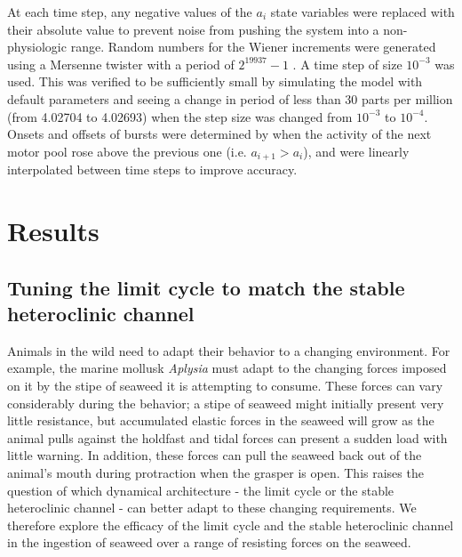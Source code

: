 At each time step, any negative values of the $a_i$ state variables were
replaced with their absolute value to prevent noise from pushing the system
into a non-physiologic range.  Random numbers for the Wiener increments were
generated using a Mersenne twister with a period of $2^{19937} - 1$
\citep{matsumoto_mersenne_1998}.  A time step of size $10^{-3}$ was used.  This
was verified to be sufficiently small by simulating the model with default
parameters and seeing a change in period of less than 30 parts per million
(from 4.02704 to 4.02693) when the step size was changed from $10^{-3}$ to
$10^{-4}$.  Onsets and offsets of bursts were determined by when the activity
of the next motor pool rose above the previous one (i.e. $a_{i+1} > a_i$), and
were linearly interpolated between time steps to improve accuracy.

\section{Results}

\subsection[Tuning the limit cycle]{Tuning the limit cycle to match the stable heteroclinic channel}
\label{sec:lc_tuning}

Animals in the wild need to adapt their behavior to a changing environment.
For example, the marine mollusk \textit{Aplysia} must adapt to the changing
forces imposed on it by the stipe of seaweed it is attempting to consume.
These forces can vary considerably during the behavior; a stipe of seaweed
might initially present very little resistance, but accumulated elastic forces
in the seaweed will grow as the animal pulls against the holdfast and tidal forces
can present a sudden load with little warning.  In addition, these forces can
pull the seaweed back out of the animal's mouth during protraction when the
grasper is open.  This raises the question of which dynamical architecture -
the limit cycle or the stable heteroclinic channel - can better adapt to these
changing requirements. We therefore explore the efficacy of the limit cycle and
the stable heteroclinic channel in the ingestion of seaweed over a range of
resisting forces on the seaweed.

